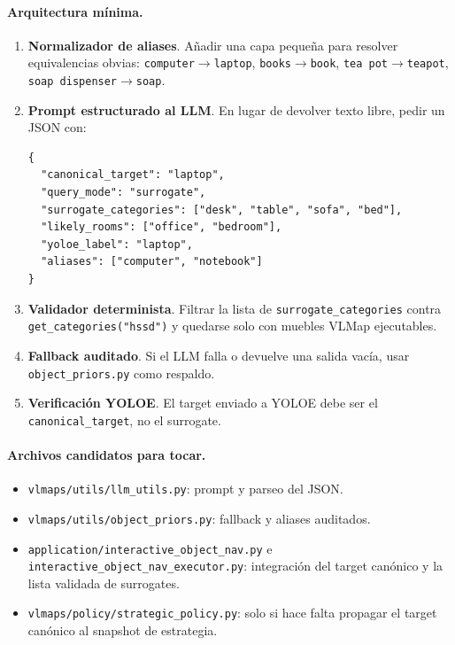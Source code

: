 \documentclass[11pt,a4paper]{article}
\begin{document}
\paragraph{Arquitectura mínima.}
\begin{enumerate}
  \item \textbf{Normalizador de aliases}. Añadir una capa pequeña para resolver
        equivalencias obvias:
        \texttt{computer}$\rightarrow$\texttt{laptop},
        \texttt{books}$\rightarrow$\texttt{book},
        \texttt{tea pot}$\rightarrow$\texttt{teapot},
        \texttt{soap dispenser}$\rightarrow$\texttt{soap}.
  \item \textbf{Prompt estructurado al LLM}. En lugar de devolver texto libre,
        pedir un JSON con:
\begin{verbatim}
{
  "canonical_target": "laptop",
  "query_mode": "surrogate",
  "surrogate_categories": ["desk", "table", "sofa", "bed"],
  "likely_rooms": ["office", "bedroom"],
  "yoloe_label": "laptop",
  "aliases": ["computer", "notebook"]
}
\end{verbatim}
  \item \textbf{Validador determinista}. Filtrar la lista de
        \texttt{surrogate\_categories} contra
        \texttt{get\_categories("hssd")} y quedarse solo con muebles VLMap
        ejecutables.
  \item \textbf{Fallback auditado}. Si el LLM falla o devuelve una salida vacía,
        usar \texttt{object\_priors.py} como respaldo.
  \item \textbf{Verificación YOLOE}. El target enviado a YOLOE debe ser el
        \texttt{canonical\_target}, no el surrogate.
\end{enumerate}

\paragraph{Archivos candidatos para tocar.}
\begin{itemize}
  \item \texttt{vlmaps/utils/llm\_utils.py}: prompt y parseo del JSON.
  \item \texttt{vlmaps/utils/object\_priors.py}: fallback y aliases auditados.
  \item \texttt{application/interactive\_object\_nav.py} e
        \texttt{interactive\_object\_nav\_executor.py}: integración del target
        canónico y la lista validada de surrogates.
  \item \texttt{vlmaps/policy/strategic\_policy.py}: solo si hace falta
        propagar el target canónico al snapshot de estrategia.
\end{itemize}
\end{document}
